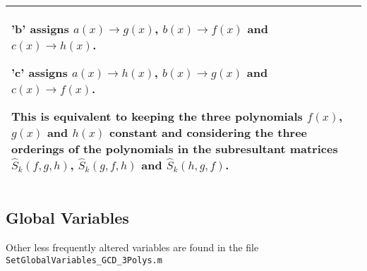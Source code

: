 \documentclass{article}
\begin{document}
\begin{longtable}[c]{|p{20em}||p{25em}|}
\begin{description}
			\item 'b' assigns 
			$a(x) \rightarrow g(x)$,
			$b(x) \rightarrow f(x)$ and
			$c(x) \rightarrow h(x)$.
			
			\item 'c' assigns
			$a(x) \rightarrow h(x)$,
			$b(x) \rightarrow g(x)$ and
			$c(x) \rightarrow f(x)$.
			
		\end{description}
		This is equivalent to keeping the three polynomials $f(x)$, $g(x)$ and $h(x)$ constant and considering the three orderings of the polynomials in the subresultant matrices 
		$\hat{S}_{k}(f, g, h)$, 
		$\hat{S}_{k}(g, f, h)$ and 
		$\hat{S}_{k}(h, g, f)$.
		
	
	
	
	\\
	\hline
	
	
	
	
	
	

\end{longtable}









\subsection{Global Variables}

Other less frequently altered variables are found in the file \texttt{SetGlobalVariables\_GCD\_3Polys.m}
\end{document}
